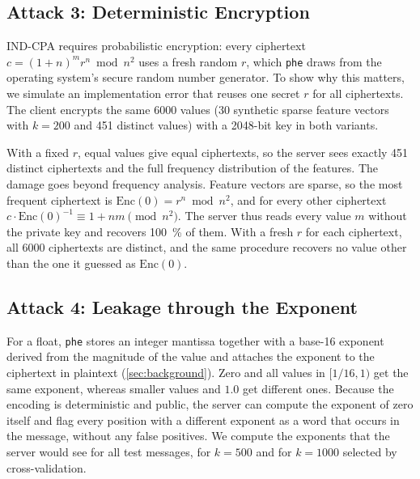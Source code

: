 \subsection{Attack 3: Deterministic Encryption}\label{sec:attack-nondeterminism}

IND-CPA requires probabilistic encryption: every ciphertext $c = (1 + n)^m r^n \bmod n^2$ uses a fresh random $r$, which \texttt{phe} draws from the operating system's secure random number generator.
To show why this matters, we simulate an implementation error that reuses one secret $r$ for all ciphertexts.
The client encrypts the same \num{6000} values (30 synthetic sparse feature vectors with $k = 200$ and \num{451} distinct values) with a \num{2048}-bit key in both variants.

With a fixed $r$, equal values give equal ciphertexts, so the server sees exactly \num{451} distinct ciphertexts and the full frequency distribution of the features.
The damage goes beyond frequency analysis.
Feature vectors are sparse, so the most frequent ciphertext is $\mathrm{Enc}(0) = r^n \bmod n^2$, and for every other ciphertext $c \cdot \mathrm{Enc}(0)^{-1} \equiv 1 + nm \pmod{n^2}$.
The server thus reads every value $m$ without the private key and recovers \SI{100}{\percent} of them.
With a fresh $r$ for each ciphertext, all \num{6000} ciphertexts are distinct, and the same procedure recovers no value other than the one it guessed as $\mathrm{Enc}(0)$.

\subsection{Attack 4: Leakage through the Exponent}\label{sec:attack-exponent}

For a float, \texttt{phe} stores an integer mantissa together with a base-16 exponent derived from the magnitude of the value and attaches the exponent to the ciphertext in plaintext (\cref{sec:background}).
Zero and all values in $[1/16, 1)$ get the same exponent, whereas smaller values and $1.0$ get different ones.
Because the encoding is deterministic and public, the server can compute the exponent of zero itself and flag every position with a different exponent as a word that occurs in the message, without any false positives.
We compute the exponents that the server would see for all test messages, for $k = 500$ and for $k = 1000$ selected by cross-validation.


